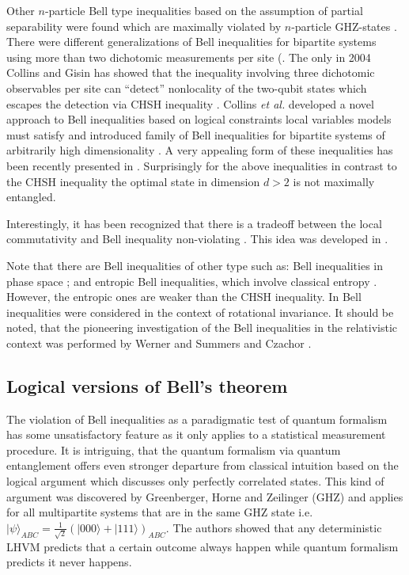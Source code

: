 \documentclass[rmp,12pt,preprint]{revtex4-2}
\begin{document}
Other $n$-particle Bell type inequalities based on the assumption of
partial separability were found which are maximally violated by
$n$-particle GHZ-states \cite {Svetlichny}. There were different
generalizations of Bell inequalities for bipartite systems using more
than two dichotomic measurements per site (\cite
{Sliwa,CG,Zukowski06,PitowskyS_nonloc2001}. The only in 2004 Collins
and Gisin has showed that the inequality involving three dichotomic
observables per site can ``detect'' nonlocality of the two-qubit
states which escapes the detection via CHSH inequality
\cite{CG}. Collins \emph{et al.} developed a novel approach to Bell
inequalities based on logical constraints local variables models must
satisfy and introduced family of Bell inequalities for bipartite
systems of arbitrarily high dimensionality \cite{CollinsGLMP-Bell-hdim}. A very
appealing form of these inequalities has been recently presented in
\cite{ZohrenGill}. Surprisingly for the above inequalities in contrast
to the CHSH inequality the optimal state in dimension $d>2$ is not
maximally entangled.

Interestingly, it has been recognized that there is a tradeoff
between the local commutativity and Bell inequality non-violating \cite{Roy-noncomut-Bell-2007}. This idea was developed in \cite{SeevinckU-loc-com-Bell-2007}.

Note that there are Bell inequalities of other type such as: Bell
inequalities in phase space \cite{AubersonMRS2003}; and entropic Bell
inequalities, which involve classical entropy
\cite{BraunsteinC1988}. However, the entropic ones are weaker than the
CHSH inequality. In \cite{NagataLWZ2004} Bell inequalities
were considered in the context of rotational invariance.
It should be noted, that the pioneering investigation
of the Bell inequalities in the relativistic context was performed by
Werner and Summers \cite{SummersW} and Czachor \cite{Czachor1}.


\subsection{Logical versions of Bell's theorem}
\label{subsec:logicBell}

The violation of Bell inequalities as a paradigmatic test of quantum
formalism has some unsatisfactory feature as it only applies to a
statistical measurement procedure. It is intriguing, that the quantum
formalism via quantum entanglement offers even stronger departure from
classical intuition based on the logical argument which discusses only
perfectly correlated states. This kind of argument was discovered by
Greenberger, Horne and Zeilinger (GHZ) and applies for all
multipartite systems that are in the same GHZ state i.e.
$|\psi\rangle_{ABC}=\frac{1}{\sqrt{2}}(|000\rangle+|111\rangle)_{ABC}$.
The authors showed that any deterministic LHVM predicts that a certain
outcome always happen while quantum formalism predicts it never
happens.
\end{document}
